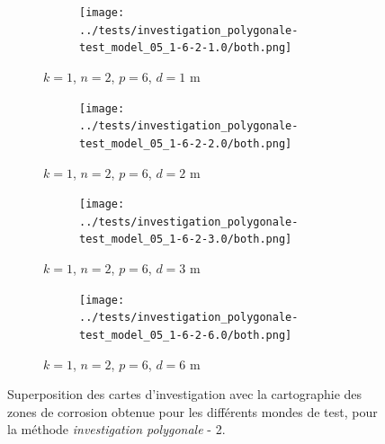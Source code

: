 \documentclass[english,RandD]{rapportPFE}  %
\begin{document}
		\begin{figure}[H]
			\centering
			\begin{subfigure}[t]{\linewidth}
				\centering
				\begin{subfigure}[t]{0.2\linewidth}
					\texttt{[image: ../tests/investigation\_polygonale-test\_model\_05\_1-6-2-1.0/both.png]}
				\end{subfigure}
				\caption{$k = 1$, $n = 2$, $p = 6$, $d = 1$ m}
			\end{subfigure}
			\hfill
			\begin{subfigure}[t]{\linewidth}
				\centering
				\begin{subfigure}[t]{0.2\linewidth}
					\texttt{[image: ../tests/investigation\_polygonale-test\_model\_05\_1-6-2-2.0/both.png]}
				\end{subfigure}
				\caption{$k = 1$, $n = 2$, $p = 6$, $d = 2$ m}
			\end{subfigure}
			\hfill
			\begin{subfigure}[t]{\linewidth}
				\centering
				\begin{subfigure}[t]{0.2\linewidth}
					\texttt{[image: ../tests/investigation\_polygonale-test\_model\_05\_1-6-2-3.0/both.png]}
				\end{subfigure}
				\caption{$k = 1$, $n = 2$, $p = 6$, $d = 3$ m}
			\end{subfigure}
			\hfill
			\begin{subfigure}[t]{\linewidth}
				\centering
				\begin{subfigure}[t]{0.2\linewidth}
					\texttt{[image: ../tests/investigation\_polygonale-test\_model\_05\_1-6-2-6.0/both.png]}
				\end{subfigure}
				\caption{$k = 1$, $n = 2$, $p = 6$, $d = 6$ m}
			\end{subfigure}
			\caption{Superposition des cartes d'investigation avec la cartographie des zones de corrosion obtenue pour les différents mondes de test, pour la méthode \textit{investigation polygonale} - 2.}
			\label{fig:investigation_polygonale_resultats_2}
		\end{figure}
\end{document}

